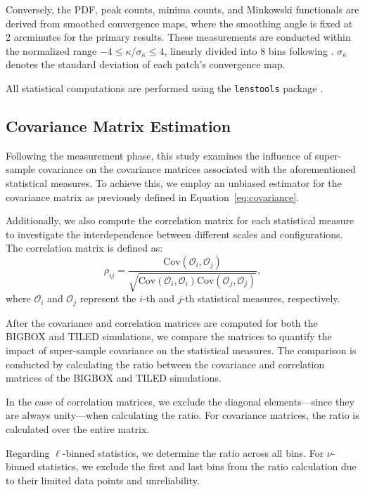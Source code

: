 Conversely, the PDF, peak counts, minima counts, and Minkowski functionals are derived from smoothed convergence maps, where the smoothing angle is fixed at 2 arcminutes for the primary results. These measurements are conducted within the normalized range $-4 \leq \kappa/\sigma_{\kappa} \leq 4$, linearly divided into 8 bins following \citet{2021A&A...648A.115M}. $\sigma_{\kappa}$ denotes the standard deviation of each patch's convergence map.

All statistical computations are performed using the \texttt{lenstools} package \citep{2016A&C....17...73P}.

\subsection{Covariance Matrix Estimation}
Following the measurement phase, this study examines the influence of super-sample covariance on the covariance matrices associated with the aforementioned statistical measures. To achieve this, we employ an unbiased estimator for the covariance matrix as previously defined in Equation~\ref{eq:covariance}. 

Additionally, we also compute the correlation matrix for each statistical measure to investigate the interdependence between different scales and configurations. The correlation matrix is defined as:
\begin{equation}
    \rho_{ij} = \frac{\text{Cov}(\mathcal{O}_i, \mathcal{O}_j)}{\sqrt{\text{Cov}(\mathcal{O}_i, \mathcal{O}_i)\text{Cov}(\mathcal{O}_j, \mathcal{O}_j)}},
\end{equation}
where $\mathcal{O}_i$ and $\mathcal{O}_j$ represent the $i$-th and $j$-th statistical measures, respectively.

After the covariance and correlation matrices are computed for both the BIGBOX and TILED simulations, we compare the matrices to quantify the impact of super-sample covariance on the statistical measures. The comparison is conducted by calculating the ratio between the covariance and correlation matrices of the BIGBOX and TILED simulations. 

In the case of correlation matrices, we exclude the diagonal elements---since they are always unity---when calculating the ratio. For covariance matrices, the ratio is calculated over the entire matrix. 

Regarding $\ell$-binned statistics, we determine the ratio across all bins. For $\nu$-binned statistics, we exclude the first and last bins from the ratio calculation due to their limited data points and unreliability.